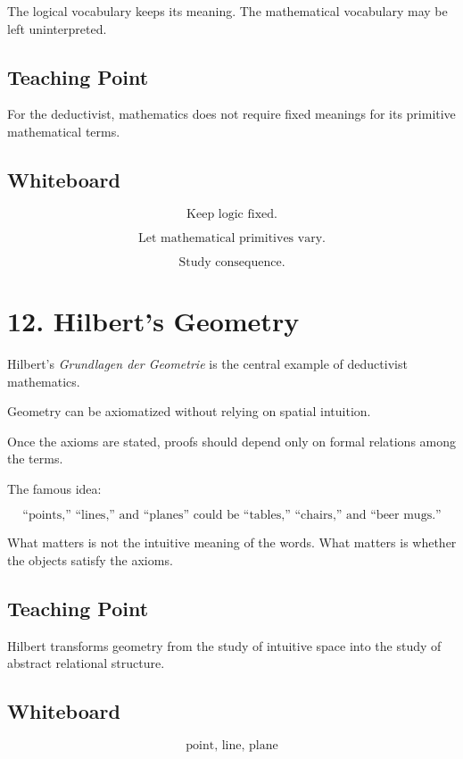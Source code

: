 \documentclass[11pt]{article}
\begin{document}
The logical vocabulary keeps its meaning. The mathematical vocabulary may be left
uninterpreted.

\subsection*{Teaching Point}

For the deductivist, mathematics does not require fixed meanings for its primitive
mathematical terms.

\subsection*{Whiteboard}

\[
\text{Keep logic fixed.}
\]

\[
\text{Let mathematical primitives vary.}
\]

\[
\text{Study consequence.}
\]

\section*{12. Hilbert's Geometry}

Hilbert's \emph{Grundlagen der Geometrie} is the central example of deductivist
mathematics.

Geometry can be axiomatized without relying on spatial intuition.

Once the axioms are stated, proofs should depend only on formal relations among the
terms.

The famous idea:

\[
\boxed{
\text{``points,'' ``lines,'' and ``planes'' could be ``tables,'' ``chairs,'' and ``beer mugs.''}
}
\]

What matters is not the intuitive meaning of the words. What matters is whether the
objects satisfy the axioms.

\subsection*{Teaching Point}

Hilbert transforms geometry from the study of intuitive space into the study of abstract
relational structure.

\subsection*{Whiteboard}

\[
\text{point, line, plane}
\]
\end{document}
